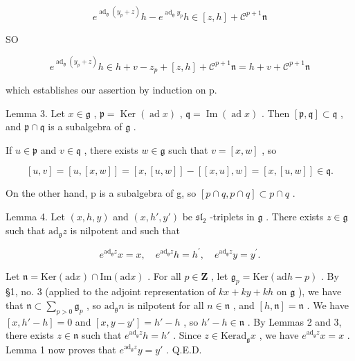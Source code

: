 \[
e ^ {\operatorname{ad} _ {\mathfrak {g}} \left(y _ {p} + z\right)} h - e ^ {\operatorname{ad} _ {\mathfrak {g}} y _ {p}} h \in [ z, h ] + \mathscr {C} ^ {p + 1} \mathfrak {n}
\]

SO

\[
e ^ {\operatorname{ad} _ {\mathfrak {g}} \left(y _ {p} + z\right)} h \in h + v - z _ {p} + [ z, h ] + \mathscr {C} ^ {p + 1} \mathfrak {n} = h + v + \mathscr {C} ^ {p + 1} \mathfrak {n}
\]

which establishes our assertion by induction on p.

Lemma 3. Let \(x \in \mathfrak{g}\) , \(\mathfrak{p} = \operatorname{Ker}(\operatorname{ad}x)\) , \(\mathfrak{q} = \operatorname{Im}(\operatorname{ad}x)\) . Then \([\mathfrak{p}, \mathfrak{q}] \subset \mathfrak{q}\) , and \(\mathfrak{p} \cap \mathfrak{q}\) is a subalgebra of \(\mathfrak{g}\) .

If \(u \in \mathfrak{p}\) and \(v \in \mathfrak{q}\) , there exists \(w \in \mathfrak{g}\) such that \(v = [x, w]\) , so

\[
[ u, v ] = [ u, [ x, w ] ] = [ x, [ u, w ] ] - [ [ x, u ], w ] = [ x, [ u, w ] ] \in \mathfrak {q}.
\]

On the other hand, p is a subalgebra of g, so \([p \cap q, p \cap q] \subset p \cap q\) .

Lemma 4. Let \((x,h,y)\) and \((x,h',y')\) be \(\mathfrak{sl}_2\) -triplets in \(\mathfrak{g}\) . There exists \(z\in \mathfrak{g}\) such that \(\mathrm{ad}_{\mathfrak{g}}z\) is nilpotent and such that

\[
e ^ {\mathrm{ad} _ {\mathfrak {g}} z} x = x, \quad e ^ {\mathrm{ad} _ {\mathfrak {g}} z} h = h ^ {\prime}, \quad e ^ {\mathrm{ad} _ {\mathfrak {g}} z} y = y ^ {\prime}.
\]

Let \(\mathfrak{n} = \mathrm{Ker}(\mathrm{ad} x) \cap \mathrm{Im}(\mathrm{ad} x)\) . For all \(p \in \mathbf{Z}\) , let \(\mathfrak{g}_p = \mathrm{Ker}(\mathrm{ad} h - p)\) . By §1, no. 3 (applied to the adjoint representation of \(kx + ky + kh\) on \(\mathfrak{g}\) ), we have that \(\mathfrak{n} \subset \sum_{p > 0} \mathfrak{g}_p\) , so \(\mathrm{ad}_{\mathfrak{g}} n\) is nilpotent for all \(n \in \mathfrak{n}\) , and \([h, \mathfrak{n}] = \mathfrak{n}\) . We have \([x, h' - h] = 0\) and \([x, y - y'] = h' - h\) , so \(h' - h \in \mathfrak{n}\) . By Lemmas 2 and 3, there exists \(z \in \mathfrak{n}\) such that \(e^{\mathrm{ad}_{\mathfrak{g}} z} h = h'\) . Since \(z \in \mathrm{Ker} \mathrm{ad}_{\mathfrak{g}} x\) , we have \(e^{\mathrm{ad}_{\mathfrak{g}} z} x = x\) . Lemma 1 now proves that \(e^{\mathrm{ad}_{\mathfrak{g}} z} y = y'\) . Q.E.D.

